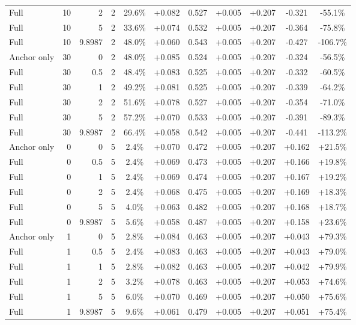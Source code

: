 \begin{table}[htbp]
\begin{tabular}{lrrrccccccc}
Full & 10 & 2 & 2 & 29.6\% & +0.082 & 0.527 & +0.005 & +0.207 & -0.321 & -55.1\% \\
Full & 10 & 5 & 2 & 33.6\% & +0.074 & 0.532 & +0.005 & +0.207 & -0.364 & -75.8\% \\
Full & 10 & 9.8987 & 2 & 48.0\% & +0.060 & 0.543 & +0.005 & +0.207 & -0.427 & -106.7\% \\
Anchor only & 30 & 0 & 2 & 48.0\% & +0.085 & 0.524 & +0.005 & +0.207 & -0.324 & -56.5\% \\
Full & 30 & 0.5 & 2 & 48.4\% & +0.083 & 0.525 & +0.005 & +0.207 & -0.332 & -60.5\% \\
Full & 30 & 1 & 2 & 49.2\% & +0.081 & 0.525 & +0.005 & +0.207 & -0.339 & -64.2\% \\
Full & 30 & 2 & 2 & 51.6\% & +0.078 & 0.527 & +0.005 & +0.207 & -0.354 & -71.0\% \\
Full & 30 & 5 & 2 & 57.2\% & +0.070 & 0.533 & +0.005 & +0.207 & -0.391 & -89.3\% \\
Full & 30 & 9.8987 & 2 & 66.4\% & +0.058 & 0.542 & +0.005 & +0.207 & -0.441 & -113.2\% \\
Anchor only & 0 & 0 & 5 & 2.4\% & +0.070 & 0.472 & +0.005 & +0.207 & +0.162 & +21.5\% \\
Full & 0 & 0.5 & 5 & 2.4\% & +0.069 & 0.473 & +0.005 & +0.207 & +0.166 & +19.8\% \\
Full & 0 & 1 & 5 & 2.4\% & +0.069 & 0.474 & +0.005 & +0.207 & +0.167 & +19.2\% \\
Full & 0 & 2 & 5 & 2.4\% & +0.068 & 0.475 & +0.005 & +0.207 & +0.169 & +18.3\% \\
Full & 0 & 5 & 5 & 4.0\% & +0.063 & 0.482 & +0.005 & +0.207 & +0.168 & +18.7\% \\
Full & 0 & 9.8987 & 5 & 5.6\% & +0.058 & 0.487 & +0.005 & +0.207 & +0.158 & +23.6\% \\
Anchor only & 1 & 0 & 5 & 2.8\% & +0.084 & 0.463 & +0.005 & +0.207 & +0.043 & +79.3\% \\
Full & 1 & 0.5 & 5 & 2.4\% & +0.083 & 0.463 & +0.005 & +0.207 & +0.043 & +79.0\% \\
Full & 1 & 1 & 5 & 2.8\% & +0.082 & 0.463 & +0.005 & +0.207 & +0.042 & +79.9\% \\
Full & 1 & 2 & 5 & 3.2\% & +0.078 & 0.463 & +0.005 & +0.207 & +0.053 & +74.6\% \\
Full & 1 & 5 & 5 & 6.0\% & +0.070 & 0.469 & +0.005 & +0.207 & +0.050 & +75.6\% \\
Full & 1 & 9.8987 & 5 & 9.6\% & +0.061 & 0.479 & +0.005 & +0.207 & +0.051 & +75.4\% \\

\end{tabular}
\end{table}
